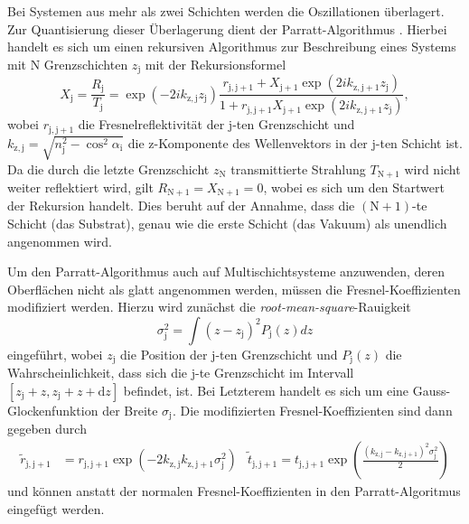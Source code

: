 Bei Systemen aus mehr als zwei Schichten werden die Oszillationen überlagert. Zur Quantisierung dieser Überlagerung dient der Parratt-Algorithmus \cite{parratt}. Hierbei handelt es sich um einen rekursiven Algorithmus zur Beschreibung eines Systems mit N Grenzschichten $z_\mathrm{j}$ mit der Rekursionsformel
\begin{equation*}
  X_\mathrm{j} = \frac{R_\mathrm{j}}{T_\mathrm{j}} = \exp \left( -2 i k_\mathrm{z,j} z_\mathrm{j} \right) \frac{ r_{\mathrm{j,j}+1} + X_{\mathrm{j}+1} \exp \left( 2i k_{\mathrm{z,j}+1} z_\mathrm{j} \right) }{ 1 + r_{\mathrm{j,j}+1} X_{\mathrm{j}+1} \exp \left( 2i k_{\mathrm{z,j}+1} z_\mathrm{j} \right) },
\end{equation*}
wobei $r_{\mathrm{j,j}+1}$ die Fresnelreflektivität der j-ten Grenzschicht und $k_{\mathrm{z,j}} = \sqrt{n_\mathrm{j}^2 - \cos^2 \alpha_\mathrm{i}} $ die z-Komponente des Wellenvektors in der j-ten Schicht ist.
Da die durch die letzte Grenzschicht $z_\mathrm{N}$ transmittierte Strahlung $T_{\mathrm{N}+1}$ wird nicht weiter reflektiert wird, gilt $R_{\mathrm{N}+1} = X_{\mathrm{N}+1} = 0$, wobei es sich um den Startwert der Rekursion handelt. Dies beruht auf der Annahme, dass die $(\mathrm{N}+1)$-te Schicht (das Substrat), genau wie die erste Schicht (das Vakuum) als unendlich angenommen wird.

Um den Parratt-Algorithmus auch auf Multischichtsysteme anzuwenden, deren Oberflächen nicht als glatt angenommen werden, müssen die Fresnel-Koeffizienten modifiziert werden. Hierzu wird zunächst die \textit{root-mean-square}-Rauigkeit
\begin{equation*}
  \sigma_\mathrm{j}^2 = \int \left( z - z_\mathrm{j} \right)^2 P_\mathrm{j} (z) dz
\end{equation*}
eingeführt, wobei $z_\mathrm{j}$ die Position der j-ten Grenzschicht und $P_\mathrm{j} (z)$ die Wahrscheinlichkeit, dass sich die j-te Grenzschicht im Intervall $[z_\mathrm{j} + z, z_\mathrm{j} + z + \mathrm{d}z]$ befindet, ist. Bei Letzterem handelt es sich um eine Gauss-Glockenfunktion der Breite $\sigma_\mathrm{j}$. Die modifizierten Fresnel-Koeffizienten sind dann gegeben durch
\begin{align*}
  \tilde{r}_{\mathrm{j,j}+1} &= r_{\mathrm{j,j}+1} \exp \left( -2 k_\mathrm{z,j} k_{\mathrm{z,j}+1} \sigma_\mathrm{j}^2 \right) &
  \tilde{t}_{\mathrm{j,j}+1} = t_{\mathrm{j,j}+1} \exp \left( \frac{ \left( k_\mathrm{z,j} - k_{\mathrm{z,j}+1} \right)^2 \sigma_\mathrm{j}^2 }{2} \right)
\end{align*}
und können anstatt der normalen Fresnel-Koeffizienten in den Parratt-Algoritmus eingefügt werden.

